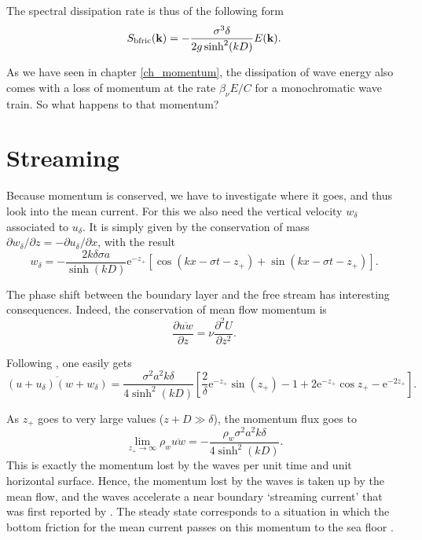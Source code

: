 The spectral dissipation rate is thus of the following form 
\begin{equation}
S_{\mathrm{bfric}}(\mathbf{k}) =-\frac{\sigma^3 \delta}{2 g \sinh^2(kD)}  E(\mathbf{k}) .
\end{equation}

As we have seen in chapter \ref{ch_momentum}, the dissipation of wave energy  also comes with a loss of momentum  at the rate 
$\beta_{\nu} E /C$ for a monochromatic wave train. So what happens to that momentum?


\section{Streaming}
Because momentum is conserved, we have to investigate where it goes, and thus look into the mean current. 
For this we also need the vertical velocity $w_\delta$ associated to $u_\delta$. It is simply given by the 
conservation of mass 
$\partial w_\delta /\partial z=-\partial u_\delta /\partial x$, with the result
\begin{equation}
w_\delta =-\frac{2 k \delta \sigma a }{\sinh(kD)} \mathrm{e}^{-z_+} \left[\cos\left(k x - \sigma t
-z_+\right) + \sin\left(k x - \sigma t
-z_+\right)\right].
\end{equation}

The phase shift between the boundary layer and the free stream has interesting consequences. Indeed, the conservation of
mean flow momentum is 
\begin{equation}
\frac{\partial \overline{u w}}{\partial z} =\nu \frac{\partial^2 U}{\partial z^2}.\label{stream_eq1}
\end{equation}

Following \cite{Phillips1977}, one easily gets  
\begin{equation}
\overline{\left(u+u_\delta \right) \left(w+w_\delta \right)} =
\frac{\sigma^2 a^2 k \delta}{4 \sinh^2(kD)}\left[\frac{2}{\delta} \mathrm{e}^{-z_+}  \sin(z_+) -1 
+ 2 \mathrm{e}^{-z_+} \cos z_+ - \mathrm{e}^{-2z_+}\right].\label{stream_eq2}
\end{equation}

As $z_+$ goes to very large values ($z+D \gg \delta$), the momentum flux goes to 
\begin{equation}
\lim_{z_+ \rightarrow \infty}  \rho_w \overline{u w}=- \frac{\rho_w \sigma^2 a^2 k \delta}{4 \sinh^2(kD)}.
\end{equation}
This is exactly the momentum lost by the waves per unit time and unit horizontal surface. Hence, the momentum lost by the waves is taken up by the mean flow, and the waves 
accelerate a near boundary `streaming current' that was first reported by \cite{Caligny1878}. The steady state corresponds to a situation in which the 
bottom friction for the mean current passes on this momentum to the sea floor \citep{Longuet-Higgins2005}. 

